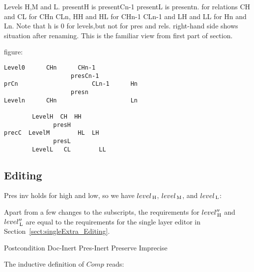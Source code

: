 Levels H,M and L. presentH is presentCn-1 presentL is presentn. for relations CH and CL for CHn CLn, HH and HL for CHn-1 CLn-1 and LH and LL for Hn and Ln. Note that h is 0 for levels,but not for pres and rels. right-hand side shows situation after renaming. This is the familiar view from first part of section.


figure:

\begin{verbatim}
Level0      CHn      CHn-1
                   presCn-1
prCn                     CLn-1      Hn
                   presn
Leveln      CHn                     Ln

        LevelH  CH  HH 
              presH
precC  LevelM        HL  LH
              presL
        LevelL   CL        LL
\end{verbatim}


\subsection{Editing} \label{sect:combinedExtra_Editing}

Pres inv holds for high and low, so we have $level_{\, \mathrm H}$, $level_{\, \mathrm M}$, and $level_{\, \mathrm L}$:





Apart from a few changes to the subscripts, the requirements for $level''_{\, \mathrm H}$ and $level''_{\, \mathrm L}$ are equal to the requirements for the single layer editor in Section~\ref{sect:singleExtra_Editing}.

		{Postcondition}
  {Doc-Inert}
		{Pres-Inert}
	{Preserve}
	{Imprecise}



The inductive definition of $Comp$ reads:

